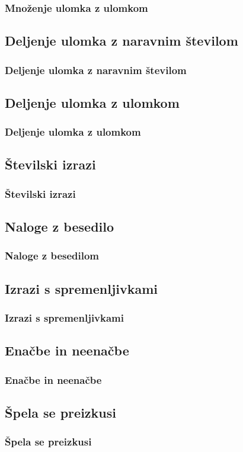         \begin{frame}
            \frametitle{Množenje ulomka z ulomkom}
        \end{frame}

    \subsection{Deljenje ulomka z naravnim številom}

        \begin{frame}
            \frametitle{Deljenje ulomka z naravnim številom}
        \end{frame}

    \subsection{Deljenje ulomka z ulomkom}

        \begin{frame}
            \frametitle{Deljenje ulomka z ulomkom}
        \end{frame}

    \subsection{Številski izrazi}

        \begin{frame}
            \frametitle{Številski izrazi}
        \end{frame}

    \subsection{Naloge z besedilo}

        \begin{frame}
            \frametitle{Naloge z besedilom}
        \end{frame}

    \subsection{Izrazi s spremenljivkami}
        
        \begin{frame}
            \frametitle{Izrazi s spremenljivkami}
        \end{frame}

    \subsection{Enačbe in neenačbe}
        
        \begin{frame}
            \frametitle{Enačbe in neenačbe}
        \end{frame}

        \subsection{Špela se preizkusi}
        
        \begin{frame}
            \frametitle{Špela se preizkusi}
        \end{frame}